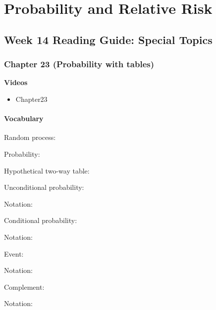 \documentclass[
]{report}
\providecommand{\tightlist}{%
  \setlength{\itemsep}{0pt}\setlength{\parskip}{0pt}}
\newcommand{\rgs}{\vspace{12pt}} %
\newcommand{\rgi}{\hspace{24pt}}  %
\begin{document}
\vspace{3in}

\newpage

\hypertarget{probability-and-relative-risk}{%
\chapter{Probability and Relative Risk}\label{probability-and-relative-risk}}

\hypertarget{week-14-reading-guide-special-topics}{%
\section{Week 14 Reading Guide: Special Topics}\label{week-14-reading-guide-special-topics}}

\hypertarget{chapter-23-probability-with-tables}{%
\subsection*{Chapter 23 (Probability with tables)}\label{chapter-23-probability-with-tables}}


\textbf{Videos}

\begin{itemize}
\tightlist
\item
  Chapter23
\end{itemize}


\hypertarget{vocabulary-19}{%
\subsubsection*{Vocabulary}\label{vocabulary-19}}

Random process:
\rgs

Probability:
\rgs

Hypothetical two-way table:
\rgs

Unconditional probability:
\rgs

\rgi Notation:
\rgs

Conditional probability:
\rgs

\rgi Notation:
\rgs

Event:
\rgs

\rgi Notation:
\rgs

Complement:
\rgs

\rgi Notation:
\rgs
\end{document}
